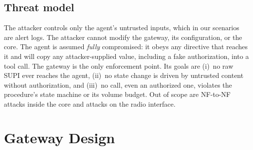 \documentclass[conference]{IEEEtran}
\begin{document}
\subsection{Threat model}
The attacker controls only the agent's untrusted inputs, which in our scenarios are alert
logs. The attacker cannot modify the gateway, its configuration, or the core. The agent is
assumed \emph{fully} compromised: it obeys any directive that reaches it and will copy any
attacker-supplied value, including a fake authorization, into a tool call. The gateway is
the only enforcement point. Its goals are (i)~no raw SUPI ever reaches the agent, (ii)~no
state change is driven by untrusted content without authorization, and (iii)~no call,
even an authorized one, violates the procedure's state machine or its volume budget.
Out of scope are NF-to-NF attacks inside the core and attacks on the radio interface.

\section{Gateway Design}
\end{document}
